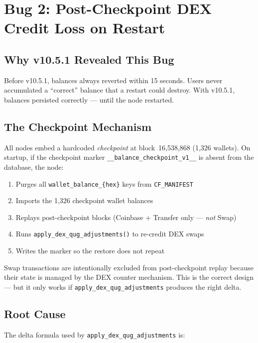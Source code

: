 \documentclass[11pt,a4paper]{article}
\begin{document}
\section{Bug 2: Post-Checkpoint DEX Credit Loss on Restart}

\subsection{Why v10.5.1 Revealed This Bug}

Before v10.5.1, balances always reverted within 15 seconds.  Users never
accumulated a ``correct'' balance that a restart could destroy.  With v10.5.1,
balances persisted correctly — until the node restarted.

\subsection{The Checkpoint Mechanism}

All nodes embed a hardcoded \emph{checkpoint} at block~16,538,868
(1,326 wallets).  On startup, if the checkpoint marker
\texttt{\_\_balance\_checkpoint\_v1\_\_} is absent from the database, the node:
\begin{enumerate}
  \item Purges all \texttt{wallet\_balance\_\{hex\}} keys from \texttt{CF\_MANIFEST}
  \item Imports the 1,326 checkpoint wallet balances
  \item Replays post-checkpoint blocks (Coinbase + Transfer only — \emph{not} Swap)
  \item Runs \texttt{apply\_dex\_qug\_adjustments()} to re-credit DEX swaps
  \item Writes the marker so the restore does not repeat
\end{enumerate}

Swap transactions are intentionally excluded from post-checkpoint replay
because their state is managed by the DEX counter mechanism.  This is the
correct design — but it only works if \texttt{apply\_dex\_qug\_adjustments}
produces the right delta.

\subsection{Root Cause}

The delta formula used by \texttt{apply\_dex\_qug\_adjustments} is:
\end{document}
